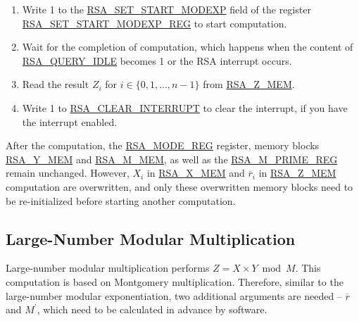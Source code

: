 \documentclass[main\_\_EN.tex]{subfiles}
\begin{document}
\begin{enumerate}
       Users need to write data to each memory block only according to the length of the number; data beyond this length is ignored.

    \item Write 1 to the \hyperref[fielddesc:RSASETSTARTMODEXP]{RSA\_SET\_START\_MODEXP} field of the register \hyperref[regdesc:RSASETSTARTMODEXPREG]{RSA\_SET\_START\_MODEXP\_REG} to start computation.

    \item Wait for the completion of computation, which happens when the content of \hyperref[fielddesc:RSAQUERYIDLE]{RSA\_QUERY\_IDLE} becomes 1 or the RSA interrupt occurs.

    \item Read the result \begin{math}Z_{i}\end{math}
        for \begin{math}i \in \{ 0, 1, \dots, n-1 \} \end{math}
        from \hyperref[tab:rsa-mem]{RSA\_Z\_MEM}.

    \item Write 1 to \hyperref[fielddesc:RSACLEARINTERRUPT]{RSA\_CLEAR\_INTERRUPT} to clear the interrupt, if you have the interrupt enabled.

\end{enumerate}

After the computation, the \hyperref[regdesc:RSAMODEREG]{RSA\_MODE\_REG} register, memory blocks \hyperref[tab:rsa-mem]{RSA\_Y\_MEM} and \hyperref[tab:rsa-mem]{RSA\_M\_MEM}, as well as the \hyperref[regdesc:RSAMPRIMEREG]{RSA\_M\_PRIME\_REG} remain unchanged. However, \begin{math}X_{i}\end{math} in \hyperref[tab:rsa-mem]{RSA\_X\_MEM} and \begin{math}\overline{r}_{i}\end{math} in \hyperref[tab:rsa-mem]{RSA\_Z\_MEM} computation are overwritten, and only these overwritten memory blocks need to be re-initialized before starting another computation.

\subsection{Large-Number Modular Multiplication}

Large-number modular multiplication performs \begin{math}Z = X \times Y \bmod M\end{math}. This computation is based on Montgomery multiplication.
Therefore, similar to the large-number modular exponentiation, two additional arguments are needed -- \begin{math}\overline{r}\end{math} and
\begin{math}M^{\prime}\end{math}, which need to be calculated in advance by software.
\end{document}
